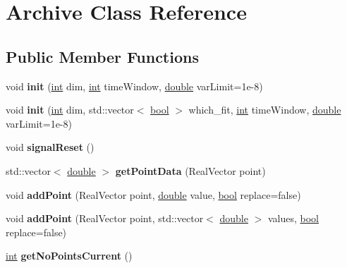 \hypertarget{classArchive}{}\section{Archive Class Reference}
\label{classArchive}
\subsection*{Public Member Functions}
\begin{DoxyCompactItemize}
\item 
void {\bfseries init} (\hyperlink{classint}{int} dim, \hyperlink{classint}{int} time\+Window, \hyperlink{classdouble}{double} var\+Limit=1e-\/8)\hypertarget{classArchive_ae9d76014f4d60f7747c49943f93b131b}{}\label{classArchive_ae9d76014f4d60f7747c49943f93b131b}

\item 
void {\bfseries init} (\hyperlink{classint}{int} dim, std\+::vector$<$ \hyperlink{classbool}{bool} $>$ which\+\_\+fit, \hyperlink{classint}{int} time\+Window, \hyperlink{classdouble}{double} var\+Limit=1e-\/8)\hypertarget{classArchive_a0889d2a96cfcd6da34901808179ef154}{}\label{classArchive_a0889d2a96cfcd6da34901808179ef154}

\item 
void {\bfseries signal\+Reset} ()\hypertarget{classArchive_a1e893bfee09a4b03f0b220b9fca69646}{}\label{classArchive_a1e893bfee09a4b03f0b220b9fca69646}

\item 
std\+::vector$<$ \hyperlink{classdouble}{double} $>$ {\bfseries get\+Point\+Data} (Real\+Vector point)\hypertarget{classArchive_acc05853d59b6baeb19f43bba59f33cc9}{}\label{classArchive_acc05853d59b6baeb19f43bba59f33cc9}

\item 
void {\bfseries add\+Point} (Real\+Vector point, \hyperlink{classdouble}{double} value, \hyperlink{classbool}{bool} replace=false)\hypertarget{classArchive_ae2af636adb9ab8b25ca418aba56fec67}{}\label{classArchive_ae2af636adb9ab8b25ca418aba56fec67}

\item 
void {\bfseries add\+Point} (Real\+Vector point, std\+::vector$<$ \hyperlink{classdouble}{double} $>$ values, \hyperlink{classbool}{bool} replace=false)\hypertarget{classArchive_a778ee52d6d0f307b9854cbbfb465421b}{}\label{classArchive_a778ee52d6d0f307b9854cbbfb465421b}

\item 
\hyperlink{classint}{int} {\bfseries get\+No\+Points\+Current} ()\hypertarget{classArchive_af0ac24e83e2faef26f96c910329a5445}{}\label{classArchive_af0ac24e83e2faef26f96c910329a5445}


\end{DoxyCompactItemize}
